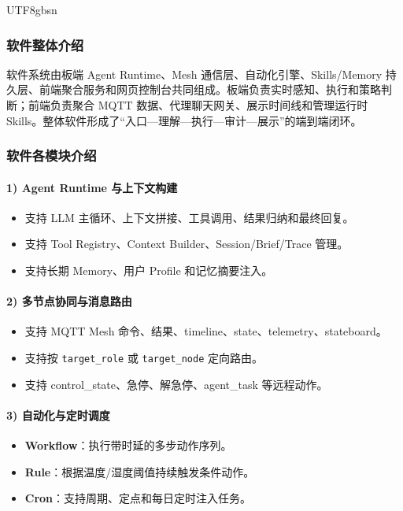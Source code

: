 \documentclass[a4paper,12pt]{article}
\begin{document}
\begin{CJK*}{UTF8}{gbsn}
\subsubsection{软件整体介绍}
软件系统由板端 Agent Runtime、Mesh 通信层、自动化引擎、Skills/Memory 持久层、前端聚合服务和网页控制台共同组成。板端负责实时感知、执行和策略判断；前端负责聚合 MQTT 数据、代理聊天网关、展示时间线和管理运行时 Skills。整体软件形成了“入口---理解---执行---审计---展示”的端到端闭环。

\subsubsection{软件各模块介绍}

\paragraph{1) Agent Runtime 与上下文构建}
\begin{itemize}
  \item 支持 LLM 主循环、上下文拼接、工具调用、结果归纳和最终回复。
  \item 支持 Tool Registry、Context Builder、Session/Brief/Trace 管理。
  \item 支持长期 Memory、用户 Profile 和记忆摘要注入。
\end{itemize}

\paragraph{2) 多节点协同与消息路由}
\begin{itemize}
  \item 支持 MQTT Mesh 命令、结果、timeline、state、telemetry、stateboard。
  \item 支持按 \texttt{target\_role} 或 \texttt{target\_node} 定向路由。
  \item 支持 control\_state、急停、解急停、agent\_task 等远程动作。
\end{itemize}

\paragraph{3) 自动化与定时调度}
\begin{itemize}
  \item \textbf{Workflow}：执行带时延的多步动作序列。
  \item \textbf{Rule}：根据温度/湿度阈值持续触发条件动作。
  \item \textbf{Cron}：支持周期、定点和每日定时注入任务。
\end{itemize}


\end{CJK*}
\end{document}
